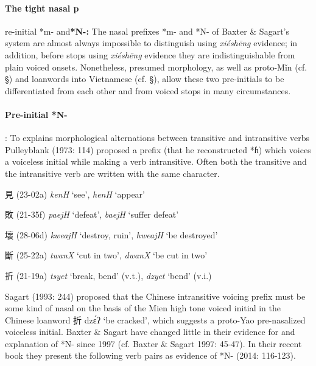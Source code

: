 \paragraph{The tight nasal p}re-initial *m-
and\textbf{*N-:} The nasal prefixes *m- and *N- of Baxter \& Sagart's
system are almost always impossible to distinguish using  \emph{xiéshēng}
evidence; in addition, before stops using  \emph{xiéshēng} evidence they
are indistinguishable from plain voiced onsets. Nonetheless, presumed
morphology, as well as proto-Mǐn (cf. §) and loanwords into Vietnamese
(cf. §), allow these two pre-initials to be differentiated from each
other and from voiced stops in many circumstances.

\paragraph{Pre-initial *N-}: To explains
morphological alternations between transitive and intransitive verbs
Pulleyblank (1973: 114) proposed a prefix (that he reconstructed *ɦ)
which voices a voiceless initial while making a verb intransitive. Often
both the transitive and the intransitive verb are written with the same
character.

\begin{description} \item
見 (23-02a) \emph{kenH} `see',  \emph{henH} `appear'
 \item
敗 (21-35f) \emph{paejH} `defeat',  \emph{baejH} `suffer defeat'
\item
壞 (28-06d) \emph{kweajH} `destroy, ruin',  \emph{hweajH} `be destroyed'
\item
斷 (25-22a) \emph{twanX} `cut in two',  \emph{dwanX} `be cut in two'
\item
折 (21-19a) \emph{tsyet} `break, bend' (v.t.),  \emph{dzyet} `bend'
(v.i.)
\end{description}

Sagart (1993: 244) proposed that the Chinese intransitive voicing prefix
must be some kind of nasal on the basis of the Mien high tone voiced
initial in the Chinese loanword 折 dzɛ́ʔ `be cracked', which suggests a
proto-Yao pre-nasalized voiceless initial. Baxter \& Sagart have changed
little in their evidence for and explanation of *N- since 1997 (cf.
Baxter \& Sagart 1997: 45-47). In their recent book they present the
following verb pairs as evidence of *N- (2014: 116-123).


